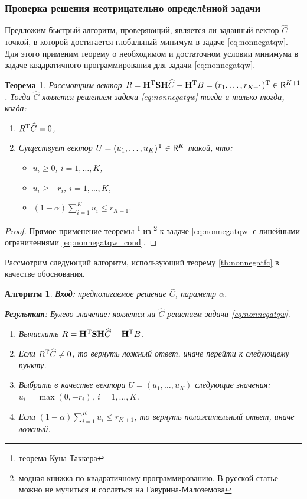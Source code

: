 \documentclass[12pt,a4paper]{article}
\newtheorem{algorithm}{Алгоритм}
\newtheorem{theorem}{Теорема}
\begin{document}
\subsubsection{Проверка решения неотрицательно определённой задачи}
Предложим быстрый алгоритм, проверяющий, является ли заданный вектор $\widehat C$ точкой, в которой достигается глобальный минимум в задаче \eqref{eq:nonnegatqw}. Для этого применим теорему о необходимом и достаточном условии минимума в задаче квадратичного программирования для задачи \eqref{eq:nonnegatqw}.
\begin{theorem}
	Рассмотрим вектор $R =  \mathbf{H}^{\mathrm{T}} \mathbf{S} \mathbf{H} \widehat C - \mathbf{H}^{\mathrm{T}} B = (r_1, \ldots, r_{K+1})^{\mathrm{T}} \in \mathsf{R}^{K+1}$. Тогда $\widehat C$ является решением задачи \eqref{eq:nonnegatqw} тогда и только тогда, когда:
	\begin{enumerate}
		\item $R^{\mathrm{T}} \widehat C = 0$,
		\item Существует вектор $U = (u_1, \ldots, u_K)^{\mathrm{T}} \in \mathsf{R}^K$ такой, что: \begin{itemize}
			\item $u_i \ge 0$, $i = 1, \ldots, K$,
			\item $u_i \ge -r_i$, $i = 1, \ldots, K$,
			\item $(1 - \alpha) \sum_{i=1}^K u_i \le r_{K+1}$.
		\end{itemize}
	\end{enumerate}
\end{theorem} \label{th:nonnegatfc}
\begin{proof}
	Прямое применение теоремы \footnote{теорема Куна-Таккера} из \footnote{модная книжка по квадратичному программированию. В русской статье можно не мучиться и сослаться на Гавурина-Малоземова} к задаче \eqref{eq:nonnegatqw} с линейными ограничениями \eqref{eq:nonnegatqw_cond}.
\end{proof}

Рассмотрим следующий алгоритм, использующий теорему \ref{th:nonnegatfc} в качестве обоснования.
\begin{algorithm}
	\label{alg:nonnegatfc}
	\textbf{Вход}: предполагаемое решение $\widehat C$, параметр $\alpha$.
	
	\textbf{Результат}:
	Булево значение: является ли $\widehat C$ решением задачи \eqref{eq:nonnegatqw}.
	
	\begin{enumerate}
		\item Вычислить $R = \mathbf{H}^{\mathrm{T}} \mathbf{S} \mathbf{H} \widehat C - \mathbf{H}^{\mathrm{T}} B$.
		\item Если $R^{\mathrm{T}} \widehat C \neq 0$, то вернуть ложный ответ, иначе перейти к следующему пункту.
		\item Выбрать в качестве вектора $U = (u_1, \ldots, u_K)$ следующие значения: $u_i = \max(0, -r_i)$, $i = 1, \ldots, K$.
		\item Если $(1 - \alpha) \sum_{i=1}^K u_i \le r_{K+1}$, то вернуть положительный ответ, иначе ложный.
	\end{enumerate}
\end{algorithm}
\end{document}
